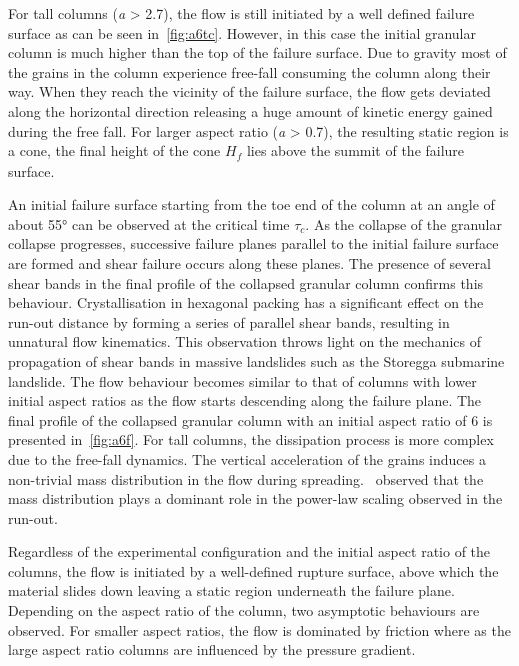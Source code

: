 For tall columns (\textit{a} > 2.7), the flow is still initiated by a well 
defined 
failure surface as can be seen in~\cref{fig:a6tc}. However, in this case the 
initial granular column is much higher than the top of the failure surface. Due 
to gravity most of the grains in the column experience free-fall 
consuming the column along their way. When they reach the vicinity of the 
failure surface, the flow gets deviated along the horizontal direction 
releasing a huge amount of kinetic energy gained during the free fall. For 
larger aspect ratio (\textit{a} > 0.7), the resulting static region is a cone, 
the final height of the cone $\textit{H}_{\textit{f}}$ lies above the 
summit of the failure surface. 

An initial failure surface starting from the toe end 
of the column at an angle of about 55$\si{\degree}$ can be observed at the 
critical time $\tau_{c}$. As the collapse of the granular collapse progresses, 
successive failure planes parallel to the initial failure surface are formed 
and shear failure occurs along these planes. The presence of several shear 
bands in the final profile of the collapsed granular column confirms this 
behaviour. Crystallisation in hexagonal packing has a significant effect on 
the run-out distance by forming a series of parallel shear bands, resulting in 
unnatural flow kinematics. This observation throws light on 
the mechanics of propagation of shear bands in massive landslides such as the 
Storegga submarine landslide. The flow behaviour becomes similar to that of 
columns with lower initial aspect ratios as the flow starts descending along 
the failure 
plane. The final profile of the collapsed granular column with an initial 
aspect ratio of 6 is presented in~\cref{fig:a6f}. For tall columns, the 
dissipation process is more complex due to the free-fall dynamics. The vertical 
acceleration of the grains induces a non-trivial mass distribution in the flow 
during spreading.~\citet{Staron2007a} observed that the mass distribution plays 
a dominant role in the power-law 
scaling observed in the run-out.

Regardless of the experimental configuration and the initial aspect ratio of 
the columns, the flow is initiated by a well-defined rupture surface, above 
which the material slides down leaving a static region underneath the failure 
plane. Depending on the aspect ratio of the column, two asymptotic behaviours 
are observed. For smaller aspect ratios, the flow is dominated by friction 
where as the large aspect ratio columns are influenced by the pressure gradient.

